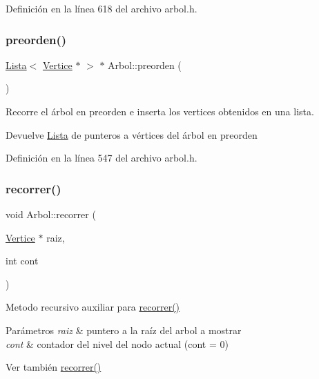 Definición en la línea 618 del archivo arbol.\+h.

\mbox{\label{classArbol_a0ffdc60ce8f2267366681cc94cf6beea}} 
\subsubsection{\texorpdfstring{preorden()}{preorden()}}
{\footnotesize\ttfamily \hyperlink{classLista}{Lista}$<$ \hyperlink{classVertice}{Vertice} $\ast$ $>$ $\ast$ Arbol\+::preorden (\begin{DoxyParamCaption}{ }\end{DoxyParamCaption})}



Recorre el árbol en preorden e inserta los vertices obtenidos en una lista. 

\begin{DoxyReturn}{Devuelve}
\hyperlink{classLista}{Lista} de punteros a vértices del árbol en preorden 
\end{DoxyReturn}


Definición en la línea 547 del archivo arbol.\+h.

\mbox{\label{classArbol_a0ae46c572d300cd4a5f27b7d00a1a14e}} 
\subsubsection{\texorpdfstring{recorrer()}{recorrer()}}
{\footnotesize\ttfamily void Arbol\+::recorrer (\begin{DoxyParamCaption}\item[{\hyperlink{classVertice}{Vertice} $\ast$}]{raiz,  }\item[{int}]{cont }\end{DoxyParamCaption})}



Metodo recursivo auxiliar para \hyperlink{classArbol_a5bd356760f63521e8578a83613aa4792}{recorrer()} 


\begin{DoxyParams}{Parámetros}
{\em raiz} & puntero a la raíz del arbol a mostrar \\
\hline
{\em cont} & contador del nivel del nodo actual (cont = 0) \\
\hline
\end{DoxyParams}
\begin{DoxySeeAlso}{Ver también}
\hyperlink{classArbol_a5bd356760f63521e8578a83613aa4792}{recorrer()} 
\end{DoxySeeAlso}


